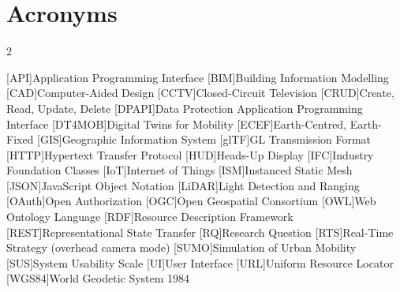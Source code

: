\chapter{Acronyms}

\footnotesize
\SingleSpacing

\begin{multicols}{2}
\begin{acronym}[AAAAAA] %

	[API]{Application Programming Interface}
	[BIM]{Building Information Modelling}
	[CAD]{Computer-Aided Design}
	[CCTV]{Closed-Circuit Television}
	[CRUD]{Create, Read, Update, Delete}
	[DPAPI]{Data Protection Application Programming Interface}
	[DT4MOB]{Digital Twins for Mobility}
	[ECEF]{Earth-Centred, Earth-Fixed}
	[GIS]{Geographic Information System}
	[glTF]{GL Transmission Format}
	[HTTP]{Hypertext Transfer Protocol}
	[HUD]{Heads-Up Display}
	[IFC]{Industry Foundation Classes}
	[IoT]{Internet of Things}
	[ISM]{Instanced Static Mesh}
	[JSON]{JavaScript Object Notation}
	[LiDAR]{Light Detection and Ranging}
	[OAuth]{Open Authorization}
	[OGC]{Open Geospatial Consortium}
	[OWL]{Web Ontology Language}
	[RDF]{Resource Description Framework}
	[REST]{Representational State Transfer}
	[RQ]{Research Question}
	[RTS]{Real-Time Strategy (overhead camera mode)}
	[SUMO]{Simulation of Urban Mobility}
	[SUS]{System Usability Scale}
	[UI]{User Interface}
	[URL]{Uniform Resource Locator}
	[WGS84]{World Geodetic System 1984}

\end{acronym}
\end{multicols}
